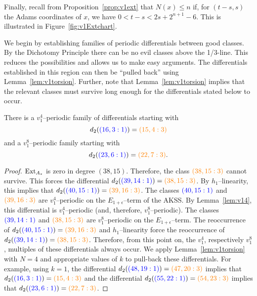 Finally, recall from Proposition~\ref{prop:v1ext} that $N(x) \leq n$ if, for $(t-s,s)$ the Adams coordinates of $x$, we have $0<t-s<2s+2^{n+1}-6$. This is illustrated in Figure~\ref{fig:v1Extchart}.


We begin by establishing families of periodic differentials between good classes. By the Dichotomy Principle
there can be no evil classes above the 1/3-line. This reduces the possibilities and allows us to make easy arguments. The differentials established in this region can then be ``pulled back'' using Lemma~\ref{lem:v1torsion}. Further, note that Lemma~\ref{lem:v1torsion} implies that the relevant classes must survive long enough for the differentials stated below to occur.


\begin{prop}\label{prop:blueoranage}
There is a $v_1^4$--periodic family of differentials starting with
\[d_2( {\color{blue}(16,3:1)}) = {\color{orange}(15,4:3)}\]
and a $v_1^8$--periodic family starting with
\[d_2( {\color{blue}(23,6:1)} ) = {\color{orange}(22,7:3)} .\]
\end{prop}
\begin{proof}
$\operatorname{Ext}_{A_*}$ is zero in degree $(38,15)$. Therefore, the class ${\color{orange}(38,15:3)}$ cannot survive. This forces the differential $d_2( {\color{blue}(39,14:1)}) = {\color{orange}(38,15:3)}$. By $h_1$--linearity, this implies that $d_2( {\color{blue}(40,15:1)}) = {\color{orange}(39,16:3)}$. The classes $ {\color{blue}(40,15:1)}$ and $ {\color{orange}(39,16:3)}$ are $v_1^4$--periodic on the $E_{1+\epsilon}$--term of the AKSS. By Lemma~\ref{lem:v14}, this differential is $v_1^4$--periodic (and, therefore, $v_1^8$--periodic). The classes $ {\color{blue}(39,14:1)}$ and ${\color{orange}(38,15:3)}$ are $v_1^8$--periodic on the $E_{1+\epsilon}$--term. The reoccurrence of $d_2( {\color{blue}(40,15:1)}) = {\color{orange}(39,16:3)}$ and $h_1$--linearity force the reoccurrence of $d_2( {\color{blue}(39,14:1)}) = {\color{orange}(38,15:3)}$. 
Therefore, from this point on, the $v_1^4$, respectively $v_1^8$, multiples of these differentials always occur. We apply Lemma~\ref{lem:v1torsion} with $N=4$ and appropriate values of $k$ to pull-back these differentials. For example, using $k=1$, the differential $d_2( {\color{blue}(48,19:1)}) = {\color{orange}(47,20:3)}$ implies that $d_2( {\color{blue}(16,3:1)}) = {\color{orange}(15,4:3)}$ and the differential $d_2( {\color{blue}(55,22:1)}) = {\color{orange}(54,23:3)}$ implies that $d_2( {\color{blue}(23,6:1)} ) = {\color{orange}(22,7:3)}$. 
\end{proof}


